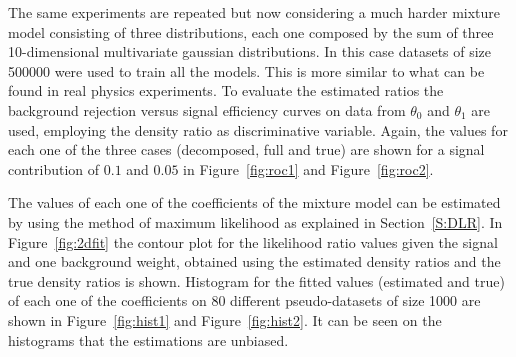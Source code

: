 \documentclass[a4paper]{jpconf}
\begin{document}
The same experiments are repeated but now considering a much harder mixture model consisting of three distributions, each one composed by the sum of three 10-dimensional multivariate gaussian distributions. In this case datasets of size 500000 were used to train all the models. This is more similar to what can be found in real physics experiments. To evaluate the estimated ratios the background rejection versus signal efficiency curves on data from $\theta_0$ and $\theta_1$ are used, employing the density ratio as discriminative variable. Again, the values for each one of the three cases (decomposed, full and true) are shown for a signal contribution of $0.1$ and $0.05$ in Figure~\ref{fig:roc1} and Figure~\ref{fig:roc2}.



The values of each one of the coefficients of the mixture model can be estimated by using the method of maximum likelihood as explained in Section~\ref{S:DLR}. In Figure~\ref{fig:2dfit} the contour plot for the likelihood ratio values given the signal and one background weight, obtained using the estimated density ratios and the true density ratios is shown. Histogram for the fitted values (estimated and true) of each one of the coefficients on 80 different pseudo-datasets of size 1000 are shown in Figure~\ref{fig:hist1} and Figure~\ref{fig:hist2}. It can be seen on the histograms that the estimations are unbiased.
\end{document}
